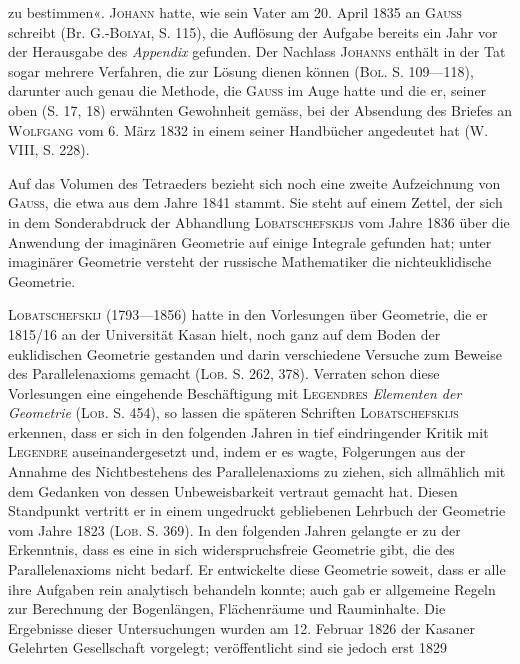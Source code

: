 zu bestimmen«. \textsc{Johann} hatte, wie sein Vater am 20. April 1835 an \textsc{Gauss}
schreibt (Br. G.-\textsc{Bolyai}, S. 115), die Auflösung der Aufgabe bereits ein Jahr
vor der Herausgabe des \textit{Appendix} gefunden. Der Nachlass \textsc{Johanns} enthält
in der Tat sogar mehrere Verfahren, die zur Lösung dienen können (\textsc{Bol.}
S. 109—118), darunter auch genau die Methode, die \textsc{Gauss} im Auge hatte
und die er, seiner oben (S. 17, 18) erwähnten Gewohnheit gemäss, bei der
Absendung des Briefes an \textsc{Wolfgang} vom 6. März 1832 in einem seiner Handbücher
angedeutet hat (W. VIII, S. 228).
\par
Auf das Volumen des Tetraeders bezieht sich noch eine zweite Aufzeichnung
von \textsc{Gauss}, die etwa aus dem Jahre 1841 stammt. Sie steht auf
einem Zettel, der sich in dem Sonderabdruck der Abhandlung \textsc{Lobatschefskijs}
vom Jahre 1836 über die Anwendung der imaginären Geometrie auf einige
Integrale gefunden hat; unter imaginärer Geometrie versteht der russische
Mathematiker die nichteuklidische Geometrie.
\par
\textsc{Lobatschefskij} (1793—1856) hatte in den Vorlesungen über Geometrie,
die er 1815/16 an der Universität Kasan hielt, noch ganz auf dem Boden der
euklidischen Geometrie gestanden und darin verschiedene Versuche zum Beweise
des Parallelenaxioms gemacht (\textsc{Lob.} S. 262, 378). Verraten schon diese
Vorlesungen eine eingehende Beschäftigung mit \textsc{Legendres} \textit{Elementen der Geometrie}
(\textsc{Lob.} S. 454), so lassen die späteren Schriften \textsc{Lobatschefskijs} erkennen,
dass er sich in den folgenden Jahren in tief eindringender Kritik mit \textsc{Legendre}
\clearpage{}\setcounter{footnote}{0}
\noindent auseinandergesetzt und, indem er es wagte, Folgerungen aus der Annahme
des Nichtbestehens des Parallelenaxioms zu ziehen, sich allmählich mit dem
Gedanken von dessen Unbeweisbarkeit vertraut gemacht hat. Diesen Standpunkt
vertritt er in einem ungedruckt gebliebenen Lehrbuch der Geometrie vom
Jahre 1823 (\textsc{Lob.} S. 369). In den folgenden Jahren gelangte er zu der Erkenntnis,
dass es eine in sich widerspruchsfreie Geometrie gibt, die des Parallelenaxioms
nicht bedarf. Er entwickelte diese Geometrie soweit, dass er alle
ihre Aufgaben rein analytisch behandeln konnte; auch gab er allgemeine
Regeln zur Berechnung der Bogenlängen, Flächenräume und Rauminhalte.
Die Ergebnisse dieser Untersuchungen wurden am 12. Februar 1826 der Kasaner
Gelehrten Gesellschaft vorgelegt; veröffentlicht sind sie jedoch erst 1829
